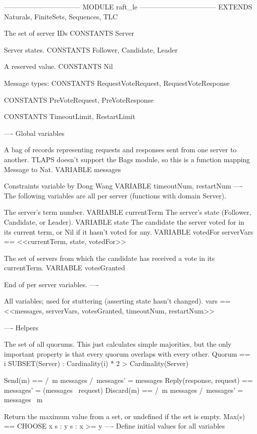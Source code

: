 --------------------------------- MODULE raft_le ---------------------------------
EXTENDS Naturals, FiniteSets, Sequences, TLC

\* The set of server IDs
CONSTANTS Server

\* Server states.
CONSTANTS Follower, Candidate, Leader

\* A reserved value.
CONSTANTS Nil

\* Message types:
CONSTANTS RequestVoteRequest, RequestVoteResponse

CONSTANTS PreVoteRequest, PreVoteResponse

CONSTANTS TimeoutLimit, RestartLimit

----
\* Global variables

\* A bag of records representing requests and responses sent from one server
\* to another. TLAPS doesn't support the Bags module, so this is a function
\* mapping Message to Nat.
VARIABLE messages

\* Constraints variable by Dong Wang
VARIABLE timeoutNum, restartNum
----
\* The following variables are all per server (functions with domain Server).

\* The server's term number.
VARIABLE currentTerm
\* The server's state (Follower, Candidate, or Leader).
VARIABLE state
\* The candidate the server voted for in its current term, or
\* Nil if it hasn't voted for any.
VARIABLE votedFor
serverVars == <<currentTerm, state, votedFor>>

\* The set of servers from which the candidate has received a vote in its
\* currentTerm.
VARIABLE votesGranted


\* End of per server variables.
----

\* All variables; used for stuttering (asserting state hasn't changed).
vars == <<messages, serverVars, votesGranted, timeoutNum, restartNum>>

----
\* Helpers

\* The set of all quorums. This just calculates simple majorities, but the only
\* important property is that every quorum overlaps with every other.
Quorum == {i \in SUBSET(Server) : Cardinality(i) * 2 > Cardinality(Server)}          


Send(m) == /\ m \notin messages 
           /\ messages' = messages 
Reply(response, request) == messages' = (messages \ {request})  
Discard(m) == /\ m \in messages 
              /\ messages' = messages \ {m}


\* Return the maximum value from a set, or undefined if the set is empty.
Max(s) == CHOOSE x \in s : \A y \in s : x >= y
----
\* Define initial values for all variables

